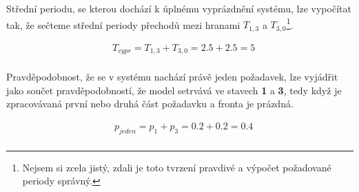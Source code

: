 \documentclass[12pt, a4paper]{article}
\begin{document}
Střední periodu, se kterou dochází k úplnému vyprázdnění systému, lze vypočítat tak, že sečteme střední periody přechodů mezi hranami $T_{1, 3}$ a $T_{3, 0}$\footnote{Nejsem si zcela jistý, zdali je toto tvrzení pravdivé a výpočet požadované periody správný.}.

\begin{equation}
    \begin{split}
    & T_{vypr} = T_{1, 3} + T_{3, 0} = 2.5 + 2.5 = 5 \\ 
    \end{split}
\end{equation}

Pravděpodobnost, že se v systému nachází právě jeden požadavek, lze vyjádřit jako součet pravděpodobností, že model setrvává ve stavech \textbf{1} a \textbf{3}, tedy když je zpracovávaná první nebo druhá část požadavku a fronta je prázdná.

\begin{equation}
    \begin{split}
    & p_{jeden} = p_{1} + p_{3} = 0.2 + 0.2 = 0.4 \\ 
    \end{split}
\end{equation}
\end{document}
